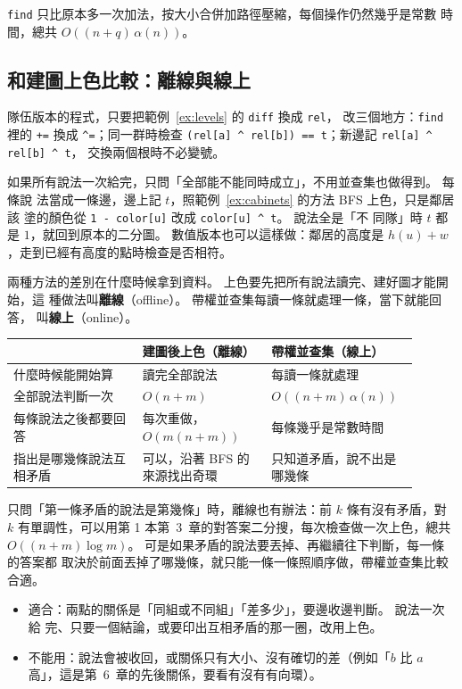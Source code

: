 \texttt{find} 只比原本多一次加法，按大小合併加路徑壓縮，每個操作仍然幾乎是常數
時間，總共 $O((n + q)\,\alpha(n))$。

\subsection{和建圖上色比較：離線與線上}

隊伍版本的程式，只要把範例~\ref{ex:levels} 的 \texttt{diff} 換成 \texttt{rel}，
改三個地方：\texttt{find} 裡的 \texttt{+=} 換成 \texttt{\^{}=}；同一群時檢查
\texttt{(rel[a] \^{} rel[b]) == t}；新邊記 \texttt{rel[a] \^{} rel[b] \^{} t}，
交換兩個根時不必變號。

如果所有說法一次給完，只問「全部能不能同時成立」，不用並查集也做得到。 每條說
法當成一條邊，邊上記 $t$，照範例~\ref{ex:cabinets} 的方法 BFS 上色，只是鄰居該
塗的顏色從 \texttt{1 - color[u]} 改成 \texttt{color[u] \^{} t}。 說法全是「不
同隊」時 $t$ 都是 $1$，就回到原本的二分圖。 數值版本也可以這樣做：鄰居的高度是
$h(u) + w$，走到已經有高度的點時檢查是否相符。

兩種方法的差別在什麼時候拿到資料。 上色要先把所有說法讀完、建好圖才能開始，這
種做法叫\textbf{離線}（offline）。 帶權並查集每讀一條就處理一條，當下就能回答，
叫\textbf{線上}（online）。

\begin{center}
\begin{tabular}{p{0.3\linewidth}p{0.3\linewidth}p{0.3\linewidth}}
\toprule
 & 建圖後上色（離線） & 帶權並查集（線上） \\
\midrule
什麼時候能開始算 & 讀完全部說法 & 每讀一條就處理 \\
全部說法判斷一次 & $O(n + m)$ & $O((n + m)\,\alpha(n))$ \\
每條說法之後都要回答 & 每次重做，$O(m(n + m))$ & 每條幾乎是常數時間 \\
指出是哪幾條說法互相矛盾 & 可以，沿著 BFS 的來源找出奇環 & 只知道矛盾，說不出是哪幾條 \\
\bottomrule
\end{tabular}
\end{center}

只問「第一條矛盾的說法是第幾條」時，離線也有辦法：前 $k$ 條有沒有矛盾，對 $k$
有單調性，可以用第 1 本第~3~章的對答案二分搜，每次檢查做一次上色，總共
$O((n + m) \log m)$。 可是如果矛盾的說法要丟掉、再繼續往下判斷，每一條的答案都
取決於前面丟掉了哪幾條，就只能一條一條照順序做，帶權並查集比較合適。

\begin{itemize}
\item 適合：兩點的關係是「同組或不同組」「差多少」，要邊收邊判斷。 說法一次給
完、只要一個結論，或要印出互相矛盾的那一圈，改用上色。
\item 不能用：說法會被收回，或關係只有大小、沒有確切的差（例如「$b$ 比 $a$
高」，這是第~6~章的先後關係，要看有沒有有向環）。
\end{itemize}

